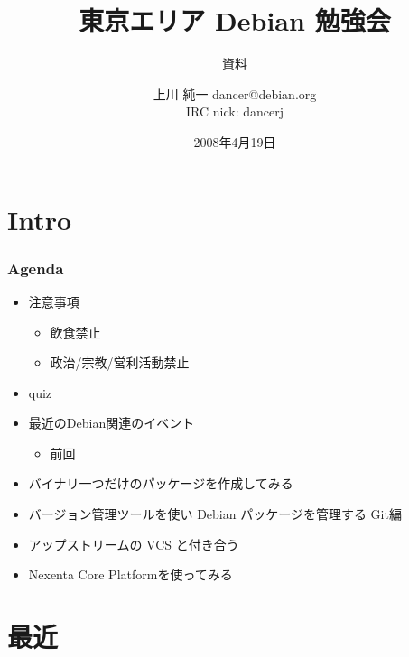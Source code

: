 \documentclass[cjk,dvipdfmx,12pt]{beamer}
\title{東京エリア Debian 勉強会}
\subtitle{資料}
\author{上川 純一 dancer@debian.org\\IRC nick: dancerj}
\date{2008年4月19日}
\begin{document}
\frame{\titlepage{}}


\section{Intro}


\begin{frame}
 \frametitle{Agenda}
\begin{minipage}[t]{0.45\hsize}
  \begin{itemize}
  \item 注意事項
	\begin{itemize}
	 \item 飲食禁止
	 \item 政治/宗教/営利活動禁止
	\end{itemize}
  \item quiz
  \item 最近のDebian関連のイベント
	\begin{itemize}
	 \item 前回 
	\end{itemize}
 \end{itemize}
\end{minipage} 
\begin{minipage}[t]{0.45\hsize}
 \begin{itemize}
  \item バイナリ一つだけのパッケージを作成してみる
  \item バージョン管理ツールを使い Debian パッケージを管理する Git編
  \item アップストリームの VCS と付き合う
  \item Nexenta Core Platformを使ってみる
 \end{itemize}
\end{minipage}
\end{frame}

\section{最近}
\end{document}

